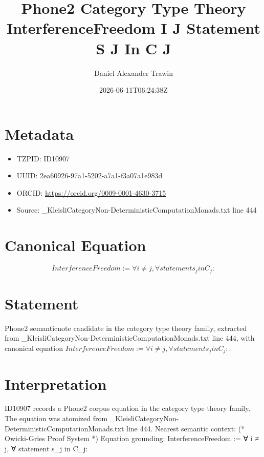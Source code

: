 \documentclass[11pt]{article}
\title{Phone2 Category Type Theory InterferenceFreedom I J Statement S J In C J}
\author{Daniel Alexander Trawin}
\date{2026-06-11T06:24:38Z}
\begin{document}
\maketitle
\section*{Metadata}
\begin{itemize}
\item TZPID: ID10907
\item UUID: 2ea60926-97a1-5202-a7a1-f3a07a1e983d
\item ORCID: \url{https://orcid.org/0009-0001-4630-3715}
\item Source: _KleisliCategoryNon-DeterministicComputationMonads.txt line 444
\end{itemize}
\section*{Canonical Equation}
\[
InterferenceFreedom := ∀ i ≠ j, ∀ statement s_j in C_j:
\]
\section*{Statement}
Phone2 semanticnote candidate in the category type theory family, extracted from _KleisliCategoryNon-DeterministicComputationMonads.txt line 444, with canonical equation $InterferenceFreedom := ∀ i ≠ j, ∀ statement s_j in C_j:$.
\section*{Interpretation}
ID10907 records a Phone2 corpus equation in the category type theory family. The equation was atomized from _KleisliCategoryNon-DeterministicComputationMonads.txt line 444. Nearest semantic context: (* Owicki-Gries Proof System *) Equation grounding: InterferenceFreedom := ∀ i ≠ j, ∀ statement s_j in C_j:
\end{document}
